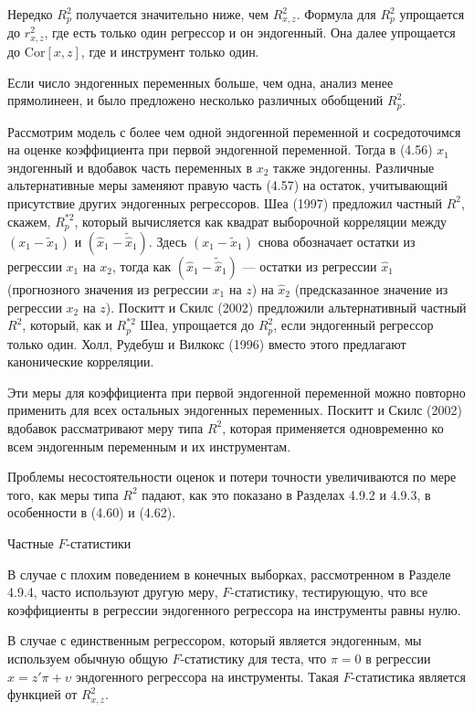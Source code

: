 Нередко $R^2_p$ получается значительно ниже, чем $R^2_{x,z}$. Формула для $R^2_p$ упрощается до $r^2_{x,z}$, где есть только один регрессор и он эндогенный. Она далее упрощается до $\mathrm{Cor}[x,z]$, где и инструмент только один.

Если число эндогенных переменных больше, чем одна, анализ менее прямолинеен, и было предложено несколько различных обобщений $R^2_p$.

Рассмотрим модель с более чем одной эндогенной переменной и сосредоточимся на оценке коэффициента при первой эндогенной переменной. Тогда в (4.56) $x_1$ эндогенный и вдобавок часть переменных в $x_2$ также эндогенны. Различные альтернативные меры заменяют правую часть (4.57) на остаток, учитывающий присутствие других эндогенных регрессоров. Шеа (1997) предложил частный $R^2$, скажем, $R_p^{*2}$, который вычисляется как квадрат выборочной корреляции между $(x_1-\tilde{x}_1)$ и $(\hat{x}_1-\tilde{\hat{x}}_1)$. Здесь $(x_1-\tilde{x}_1)$ снова обозначает остатки из регрессии $x_1$ на $x_2$, тогда как  $(\hat{x}_1-\tilde{\hat{x}}_1)$ --- остатки из регрессии $\hat{x}_1$ (прогнозного значения из регрессии $x_1$ на $z$) на $\hat{x}_2$ (предсказанное значение из регрессии $x_2$ на $z$). Поскитт и Скилс (2002) предложили альтернативный частный $R^2$, который, как и $R_p^{*2}$ Шеа, упрощается до $R^2_p$, если эндогенный регрессор только один. Холл, Рудебуш и Вилкокс (1996) вместо этого предлагают канонические корреляции.

Эти меры для коэффициента при первой эндогенной переменной можно повторно применить для всех остальных эндогенных переменных.  Поскитт и Скилс (2002) вдобавок рассматривают меру типа $R^2$, которая применяется одновременно ко всем эндогенным переменным и их инструментам.

Проблемы несостоятельности оценок и потери точности увеличиваются по мере того, как меры типа $R^2$ падают, как это показано в Разделах 4.9.2 и 4.9.3, в особенности в (4.60) и (4.62).
\begin{center}
Частные $F$-статистики
\end{center}
В случае с плохим поведением в конечных выборках, рассмотренном в Разделе 4.9.4, часто используют другую меру, $F$-статистику, тестирующую, что все коэффициенты в регрессии эндогенного регрессора на инструменты равны нулю. 

В случае с единственным регрессором, который является эндогенным, мы используем обычную общую $F$-статистику для теста, что $\pi=0$ в регрессии $x=z'\pi+\upsilon$ эндогенного регрессора на инструменты. Такая $F$-статистика является функцией от $R^2_{x,z}$.

